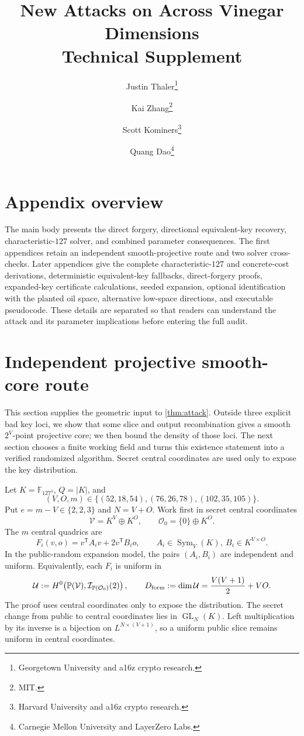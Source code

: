 \documentclass[11pt,a4paper]{article}
\title{\bfseries New Attacks on \QRUOV{} Across Vinegar Dimensions\\[0.5em]
\large Technical Supplement}
\author{Justin Thaler\thanks{Georgetown University and a16z crypto research.}
\and Kai Zhang\thanks{MIT.}
\and Scott Kominers\thanks{Harvard University and a16z crypto research.}
\and Quang Dao\thanks{Carnegie Mellon University and LayerZero Labs.}}
\theoremstyle{definition}
\theoremstyle{remark}
\newcommand{\F}{\mathbb F}
\newcommand{\PP}{\mathbb P}
\newcommand{\cO}{\mathcal O}
\newcommand{\cU}{\mathcal U}
\newcommand{\cV}{\mathcal V}
\newcommand{\Sym}{\operatorname{Sym}}
\begin{document}
\maketitle

\appendix
\section*{Appendix overview}
The main body presents the direct forgery, directional equivalent-key recovery,
characteristic-$127$ solver, and combined parameter consequences.  The first
appendices retain an independent smooth-projective route and two solver
cross-checks.  Later appendices give the complete characteristic-$127$ and
concrete-cost derivations, deterministic equivalent-key fallbacks,
direct-forgery proofs, expanded-key certificate calculations, seeded
expansion, optional identification with the planted oil space, alternative
low-space directions, and executable pseudocode.  These details are separated
so that readers can understand the attack and its parameter implications
before entering the full audit.

\section{Independent projective smooth-core route}\label{sec:projective}

This section supplies the geometric input to \cref{thm:attack}.  Outside three explicit bad key loci, we show that some slice and output recombination gives a smooth $2^V$-point projective core; we then bound the density of those loci.  The next section chooses a finite working field and turns this existence statement into a verified randomized algorithm.  Secret central coordinates are used only to expose the key distribution.

Let $K=\F_{127^3}$, $Q=|K|$, and
\[
(V,O,m)\in\{(52,18,54),(76,26,78),(102,35,105)\}.
\]
Put $e=m-V\in\{2,2,3\}$ and $N=V+O$.  Work first in secret central coordinates
\[
\cV=K^V\oplus K^O,
\qquad
\cO_0=\{0\}\oplus K^O.
\]
The $m$ central quadrics are
\begin{equation}\label{eq:central-slice}
F_i(v,o)=v^{\mathsf T}A_i v+2v^{\mathsf T}B_i o,
\qquad
A_i\in\Sym_V(K),\ B_i\in K^{V\times O}.
\end{equation}
In the public-random expansion model, the pairs $(A_i,B_i)$ are independent and uniform.  Equivalently, each $F_i$ is uniform in
\[
\cU:=H^0\!\left(\PP(\cV),\mathcal I_{\PP(\cO_0)}(2)\right),
\qquad
D_{\rm form}:=\dim\cU=\frac{V(V+1)}2+VO.
\]
The proof uses central coordinates only to expose the distribution.  The secret change from public to central coordinates lies in $\operatorname{GL}_N(K)$.  Left multiplication by its inverse is a bijection on $L^{N\times(V+1)}$, so a uniform public slice remains uniform in central coordinates.
\end{document}
